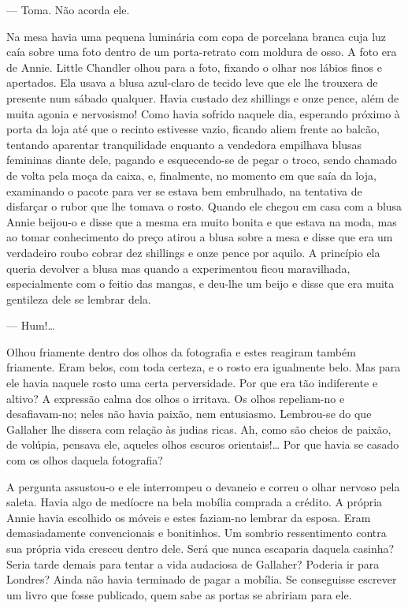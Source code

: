 --- Toma. Não acorda ele.

Na mesa havia uma pequena luminária com copa de porcelana branca cuja
luz caía sobre uma foto dentro de um porta-retrato com moldura de
osso. A foto era de Annie. Little Chandler olhou
para a foto, fixando o olhar nos lábios finos e apertados. Ela usava
a blusa azul-claro de tecido leve que ele lhe trouxera de presente num
sábado qualquer. Havia custado dez shillings e onze pence, além de
muita agonia e nervosismo! Como havia sofrido naquele dia, esperando
próximo à porta da loja até que o recinto estivesse vazio, ficando
aliem frente ao balcão, tentando aparentar tranquilidade enquanto a
vendedora empilhava blusas femininas diante dele, pagando e
esquecendo-se de pegar o troco, sendo chamado de volta pela moça da
caixa, e, finalmente, no momento em que saía da loja, examinando o
pacote para ver se estava bem embrulhado, na tentativa de disfarçar
o rubor que lhe tomava o rosto. Quando ele chegou em casa com a blusa
Annie beijou-o e disse que a mesma era muito bonita e que estava na
moda, mas ao tomar conhecimento do preço atirou a blusa sobre a mesa e
disse que era um verdadeiro roubo cobrar dez shillings e onze pence
por aquilo. A princípio ela queria devolver a blusa mas quando a
experimentou ficou maravilhada, especialmente com o feitio das
mangas, e deu-lhe um beijo e disse que era muita gentileza dele se
lembrar dela.

--- Hum!\ldots{}

Olhou friamente dentro dos olhos da fotografia e estes reagiram
também friamente. Eram belos, com toda certeza, e o rosto era
igualmente belo. Mas para ele havia naquele rosto uma certa
perversidade. Por que era tão indiferente e altivo? A expressão calma
dos olhos o irritava. Os olhos repeliam-no e desafiavam-no; neles não
havia paixão, nem entusiasmo. Lembrou-se do que Gallaher lhe dissera
com relação às judias ricas. Ah, como são cheios de paixão, de
volúpia, pensava ele, aqueles olhos escuros orientais!\ldots{} Por que
havia se casado com os olhos daquela fotografia?

A pergunta assustou-o e ele interrompeu o devaneio e correu o olhar
nervoso pela saleta. Havia algo de medíocre na bela mobília comprada a
crédito. A própria Annie havia escolhido os móveis e estes faziam-no
lembrar da esposa. Eram demasiadamente convencionais e bonitinhos.
Um sombrio ressentimento contra sua própria vida cresceu dentro dele.
Será que nunca escaparia daquela casinha? Seria tarde demais para
tentar a vida audaciosa de Gallaher? Poderia ir para Londres? Ainda não havia
terminado de pagar a mobília. Se conseguisse escrever um livro que
fosse publicado, quem sabe as portas se abririam para ele.

